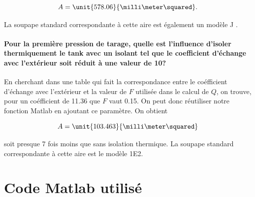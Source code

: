 $$A = \unit{578.06}{\milli\meter\squared}.$$

La soupape standard correspondante à cette aire est également
un modèle J \cite{mignon}.

\paragraph{Pour la première pression de tarage, quelle est l'influence
d'isoler thermiquement le tank avec un isolant tel que le coefficient
d'échange avec l'extérieur soit réduit à une valeur de
\unit{10}{\watt\per\meter\squared\kelvin}?}
En cherchant dans une table qui fait la correspondance 
entre le coéfficient d'échange avec l'extérieur et la valeur
de $F$ utilisée dans le calcul de $Q$, on trouve, pour un
coéfficient de 11.36 que $F$ vaut 0.15. On peut donc
réutiliser notre fonction Matlab en ajoutant ce paramètre.
On obtient 

$$A = \unit{103.463}{\milli\meter\squared}$$

soit presque 7 fois moins que sans isolation thermique.
La soupape standard correspondante à cette aire est le modèle
1E2.

\annexe
\section{Code Matlab utilisé}
\label{code-matlab}



